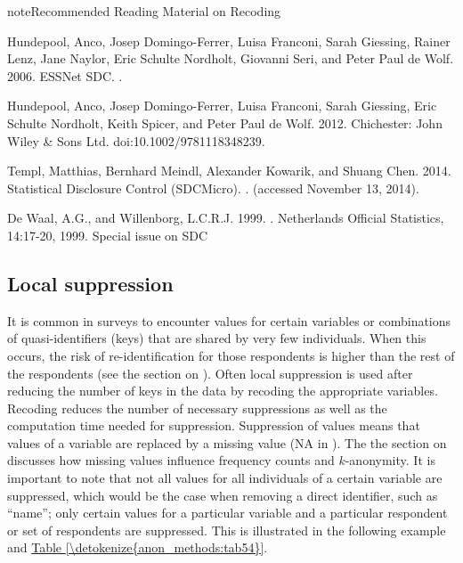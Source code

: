 \documentclass[letterpaper,10pt,english]{sphinxmanual}
\begin{document}
\begin{sphinxadmonition}{note}{Recommended Reading Material on Recoding}

Hundepool, Anco, Josep Domingo-Ferrer, Luisa Franconi, Sarah Giessing,
Rainer Lenz, Jane Naylor, Eric Schulte Nordholt, Giovanni Seri, and
Peter Paul de Wolf. 2006. 
ESSNet SDC. .

Hundepool, Anco, Josep Domingo-Ferrer, Luisa Franconi, Sarah Giessing,
Eric Schulte Nordholt, Keith Spicer, and Peter Paul de Wolf. 2012.
 Chichester: John Wiley \& Sons Ltd.
doi:10.1002/9781118348239.

Templ, Matthias, Bernhard Meindl, Alexander Kowarik, and Shuang Chen.
2014. Statistical Disclosure Control (SDCMicro).
. (accessed
November 13, 2014).

De Waal, A.G., and Willenborg, L.C.R.J. 1999. . Netherlands Official Statistics,
14:17-20, 1999. Special issue on SDC
\end{sphinxadmonition}


\subsection{Local suppression}
\label{\detokenize{anon_methods:local-suppression}}
It is common in surveys to encounter values for certain variables or
combinations of quasi-identifiers (keys) that are shared by very few
individuals. When this occurs, the risk of re-identification for those
respondents is higher than the rest of the respondents (see
the section on ).
Often local suppression is used
after reducing the number of keys in the data by recoding the
appropriate variables. Recoding reduces the number of necessary
suppressions as well as the computation time needed for suppression.
Suppression of values means that values of a variable are replaced by a
missing value (NA in ). The the section on 
discusses how missing values influence frequency counts and
\(k\)-anonymity. It is important to note that not all values for all
individuals of a certain variable are suppressed, which would be the
case when removing a direct identifier, such as “name”; only certain
values for a particular variable and a particular respondent or set of
respondents are suppressed. This is illustrated in the following example
and \hyperref[\detokenize{anon_methods:tab54}]{Table \ref{\detokenize{anon_methods:tab54}}}.
\end{document}
